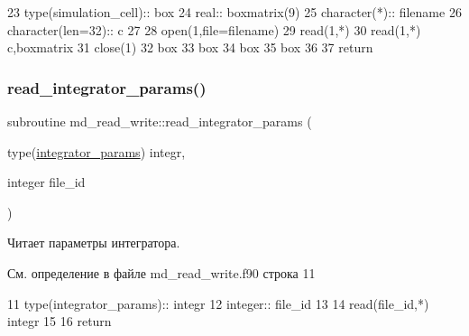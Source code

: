 \begin{DoxyCode}
23     \textcolor{keywordtype}{type}(simulation\_cell):: box
24     \textcolor{keywordtype}{real}:: boxmatrix(9)
25     \textcolor{keywordtype}{character(*)}::  filename
26     \textcolor{keywordtype}{character(len=32)}:: c
27 
28     \textcolor{keyword}{open}(1,file=filename)
29     \textcolor{keyword}{read}(1,*)
30     \textcolor{keyword}{read}(1,*) c,boxmatrix
31     \textcolor{keyword}{close}(1)
32     box%
33     box%
34     box%
35     box%
36     
37     \textcolor{keywordflow}{return}
\end{DoxyCode}
\mbox{\label{namespacemd__read__write_a13e739c9b44b3100ee36e864eac3d5e0}} 
\subsubsection{\texorpdfstring{read\+\_\+integrator\+\_\+params()}{read\_integrator\_params()}}
{\footnotesize\ttfamily subroutine md\+\_\+read\+\_\+write\+::read\+\_\+integrator\+\_\+params (\begin{DoxyParamCaption}\item[{type(\mbox{\hyperlink{structmd__general_1_1integrator__params}{integrator\+\_\+params}})}]{integr,  }\item[{integer}]{file\+\_\+id }\end{DoxyParamCaption})}



Читает параметры интегратора. 



См. определение в файле md\+\_\+read\+\_\+write.\+f90 строка 11


\begin{DoxyCode}
11     \textcolor{keywordtype}{type}(integrator\_params):: integr
12     \textcolor{keywordtype}{integer}:: file\_id 
13 
14     \textcolor{keyword}{read}(file\_id,*) integr%
15 
16     \textcolor{keywordflow}{return}
\end{DoxyCode}
\mbox{\label{namespacemd__read__write_a1a0fd7df876318fd4247d110936384d8}} 
